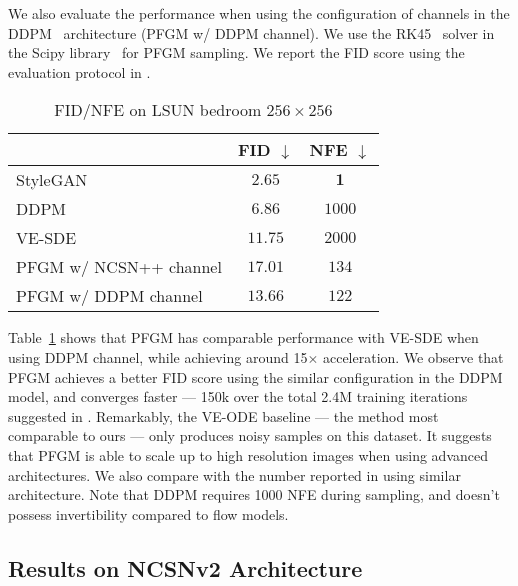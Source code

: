 We also evaluate the performance when using the configuration of channels in the DDPM~\cite{Ho2020DenoisingDP} architecture (PFGM w/ DDPM channel). We use the RK45~\citep{Dormand1980AFO} solver in the Scipy library~\citep{Virtanen2020SciPy1F} for PFGM sampling. We report the FID score using the evaluation protocol in \cite{dhariwal2021diffusion}.
\begin{table}[htbp]
\begin{center}
\caption{FID/NFE on LSUN bedroom $256\times 256$}\label{tab:lsun}
\begin{tabular}{l c c}
\toprule
      &FID $\downarrow$ & NFE $\downarrow$\\
    \midrule
    StyleGAN~\cite{karras2019style} & $\bm{2.65}$ & $\bm{1}$ \\
    DDPM~\cite{Ho2020DenoisingDP} &$6.86$ & $1000$\\
    VE-SDE~\cite{Song2021ScoreBasedGM} & $11.75$  &  $2000$\\
    \midrule
    PFGM w/ NCSN++ channel &  ${17.01}$  &  $134$\\
    PFGM w/ DDPM channel&   ${13.66}$ & ${122}$ \\
     \bottomrule
\end{tabular}
\end{center}
\end{table}

Table~\ref{tab:lsun} shows that PFGM has comparable performance with VE-SDE when using DDPM channel, while achieving around 15$\times$ acceleration. We observe that PFGM achieves a better FID score using the similar configuration in the DDPM model, and converges faster — 150k over the total 2.4M training iterations suggested in \cite{Song2021ScoreBasedGM}. Remarkably, the VE-ODE baseline — the method most comparable to ours — only produces noisy samples on this dataset. It suggests that PFGM is able to scale up to high resolution images when using advanced architectures. 
We also compare with the number reported in \cite{Ho2020DenoisingDP} using similar architecture. Note that DDPM requires 1000 NFE during sampling, and doesn’t possess invertibility compared to flow models. 



\subsection{Results on NCSNv2 Architecture}

